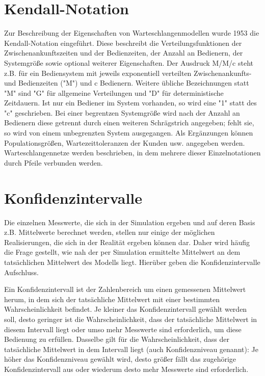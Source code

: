 \section*{Kendall-Notation}


Zur Beschreibung der Eigenschaften von Warteschlangenmodellen wurde 1953 die Kendall-Notation eingeführt.
Diese beschreibt die Verteilungsfunktionen der Zwischenankunftszeiten und der Bedienzeiten, der Anzahl an
Bedienern, der Systemgröße sowie optional weiterer Eigenschaften. Der Ausdruck M/M/c steht z.B. für ein
Bediensystem mit jeweils exponentiell verteilten Zwischenankunfts- und Bedienzeiten ("M") und c Bedienern.
Weitere übliche Bezeichnungen statt "M" sind "G" für allgemeine Verteilungen und "D" für deterministische
Zeitdauern. Ist nur ein Bediener im System vorhanden, so wird eine "1" statt des "c" geschrieben. Bei einer
begrentzen Systemgröße wird nach der Anzahl an Bedienern diese getrennt durch einen weiteren Schrägstrich
angegeben; fehlt sie, so wird von einem unbegrenzten System ausgegangen. Als Ergänzungen können Populationsgrößen,
Wartezeittoleranzen der Kunden usw. angegeben werden. Warteschlangennetze werden beschrieben, in dem mehrere
dieser Einzelnotationen durch Pfeile verbunden werden.

\section*{Konfidenzintervalle}


Die einzelnen Messwerte, die sich in der Simulation ergeben und auf
deren Basis z.B. Mittelwerte
berechnet werden, stellen nur einige der möglichen Realisierungen,
die sich in der Realität ergeben können dar. Daher wird häufig die
Frage gestellt, wie nah der per Simulation ermittelte Mittelwert
an dem tatsächlichen Mittelwert des Modells liegt. Hierüber geben
die Konfidenzintervalle Aufschluss.


Ein Konfidenzintervall ist der Zahlenbereich um einen gemessenen Mittelwert
herum, in dem sich der tatsächliche Mittelwert mit einer bestimmten
Wahrscheinlichkeit befindet. Je kleiner das Konfidenzintervall gewählt
werden soll, desto geringer ist die Wahrscheinlichkeit, dass der tatsächliche
Mittelwert in diesem Intervall liegt oder umso mehr Messwerte sind erforderlich,
um diese Bedienung zu erfüllen. Dasselbe gilt für die Wahrscheinlichkeit,
dass der tatsächliche Mittelwert in dem Intervall liegt (auch Konfidenzniveau genannt):
Je höher das Konfidenzniveau gewählt wird, desto größer fällt das zugehörige
Konfidenzintervall aus oder wiederum desto mehr Messwerte sind erforderlich.

